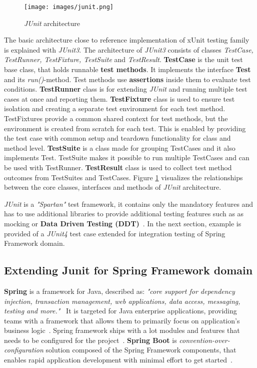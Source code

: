     \begin{figure}[ht]
      \begin{center}
        \texttt{[image: images/junit.png]}
        \caption{\textit{JUnit} architecture}
        \label{fig:junit}
      \end{center}
    \end{figure}

    The basic architecture close to reference implementation of xUnit testing family~\cite{hamill2004unit} is explained with
    \textit{JUnit3}. The architecture of \textit{JUnit3} consists of classes \textit{TestCase, TestRunner, TestFixture, TestSuite} and \textit{TestResult}.
    \textbf{TestCase} is the unit test base class, that holds runnable \textbf{test methods}.
    It implements the interface \textbf{Test} and its \textit{run()}-method. Test methods use \textbf{assertions} inside them to evaluate test conditions.
    \textbf{TestRunner} class is for extending \textit{JUnit} and running multiple test cases at once and reporting
    them. \textbf{TestFixture} class is used to ensure test isolation and creating a separate test environment for each test method.
    TestFixtures provide a common shared context for test methods, but the environment is created from scratch for each test.
    This is enabled by providing the test case with common setup and teardown functionality for class and method level.
    \textbf{TestSuite} is a class made for grouping TestCases and it also implements Test. TestSuite makes it possible to run multiple TestCases and can
    be used with TestRunner. \textbf{TestResult} class is used to collect test method outcomes from TestSuites and TestCases.
    Figure \ref{fig:junit} visualizes the relationships between the core classes, interfaces and methods of	\textit{JUnit} architecture. ~\cite{hamill2004unit}

    \textit{JUnit} is a \textit{"Spartan"} test framework, it contains only the mandatory features and has to use additional libraries
    to provide additional testing features such as as mocking or \textbf{Data Driven Testing (DDT)}~\cite{kapelonis2016java}.
    In the next section, example is provided of a \textit{JUnit4} test case extended for integration testing of Spring Framework domain.

    \subsection{Extending Junit for Spring Framework domain}
    \label{section:junit-extend}
    \textbf{Spring} is a framework for Java, described as:
    \textit{"core support for dependency injection, transaction management, web applications, data access, messaging, testing and more."}~\cite{spring}
    It is targeted for Java enterprise applications, providing teams with a framework that allows them to primarily focus on
    application's business logic~\cite{spring}. Spring framework ships with a lot modules and features that needs to be
    configured for the project~\cite{wiki:spring}. \textbf{Spring Boot} is \textit{convention-over-configuration} solution
    composed of the Spring Framework components, that enables rapid application development with minimal effort to get started~\cite{wiki:spring}.

